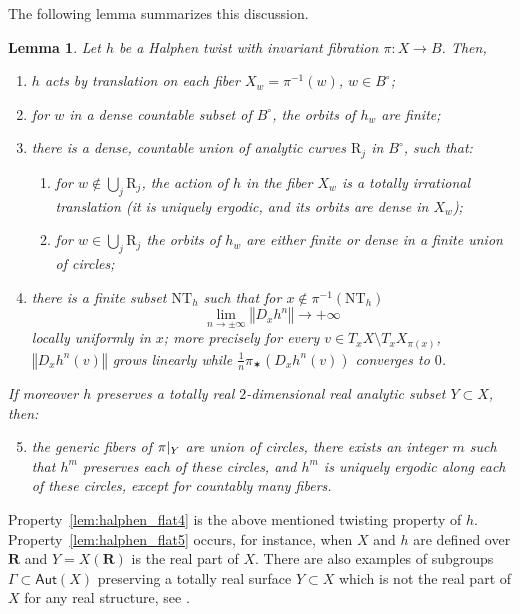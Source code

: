 \documentclass[11pt]{article}
\newcommand{\norm}[1]{{\left\Vert#1\right\Vert}}
\newcommand{\rest}[1]{ \arrowvert_{#1}}
\newcommand{\lrpar}[1]{\left(#1\right)}
\newcommand{\inv}{^{-1}}
\def\R{\mathbf{R}}
\newcommand\Aut{\mathsf{Aut}}
\theoremstyle{plain}
\newtheorem{lem}[thm]{Lemma}
\theoremstyle{definition}
\numberwithin{equation}{section}
\begin{document}
The following lemma summarizes this discussion.

\begin{lem}\label{lem:halphen_flat} Let $h$ be a Halphen twist with invariant fibration
$\pi:X\to B$. Then,
\begin{enumerate}
\item\label{lem:halphen_flat1} $h$ acts by translation on each fiber $X_w=\pi^{-1}(w)$, $w \in B^\circ$;
\item\label{lem:halphen_flat2} for $w$ in a dense countable subset of $B^\circ$, the orbits of $h_w$ are finite;
\item\label{lem:halphen_flat3} there is a dense, countable union of analytic curves $\mathrm R_j$ in $B^\circ$,
such that:
\begin{enumerate}
\item\label{lem:halphen_flat3a} for $w\notin\bigcup_j \mathrm R_j$, the action of $h$ in the fiber $X_w$ is a totally irrational
translation (it is uniquely ergodic, and its orbits are dense in $X_w$);
\item\label{lem:halphen_flat3b} for $w\in \bigcup_j \mathrm R_j$ the orbits of $h_w$ are either finite or dense in a finite union of circles;
\end{enumerate}
\item\label{lem:halphen_flat4} there is a finite subset $\mathrm{NT}_h$ such that for $x\notin \pi\inv\lrpar{
\mathrm{NT}_h}$
\[
\lim_{n\to \pm \infty} \norm{D_xh^n}\to +\infty
\]
locally uniformly in $x$; more precisely for every
$v\in T_xX \setminus T_x X_{\pi(x)}$, $\norm{D_x h^{n}(v)}$ grows linearly while
$\frac{1}{n}\pi_\varstar (D_xh^{n}(v))$ converges to $0$.
\end{enumerate}
If moreover $h$ preserves a totally real $2$-dimensional real analytic subset $Y\subset X$, then:
\begin{enumerate}\setcounter{enumi}{4}
\item\label{lem:halphen_flat5} the generic fibers of $\pi\rest{Y}$ are union of circles,
there exists an integer $m$ such that $h^m$ preserves each of these circles, and $h^m$ is uniquely ergodic along each of these circles,
except for countably many fibers.
\end{enumerate}
\end{lem}

Property~\eqref{lem:halphen_flat4} is the above mentioned twisting property of $h$. Property~\eqref{lem:halphen_flat5} occurs, for instance, when $X$ and $h$ are defined over $\R$
and $Y=X(\R)$ is the real part of $X$. There are also examples of
subgroups $\Gamma\subset \Aut(X)$ preserving a totally real surface $Y\subset X$ which is not the real part of $X$ for any real structure, see \cite[\S 9]{invariant}.
\end{document}
